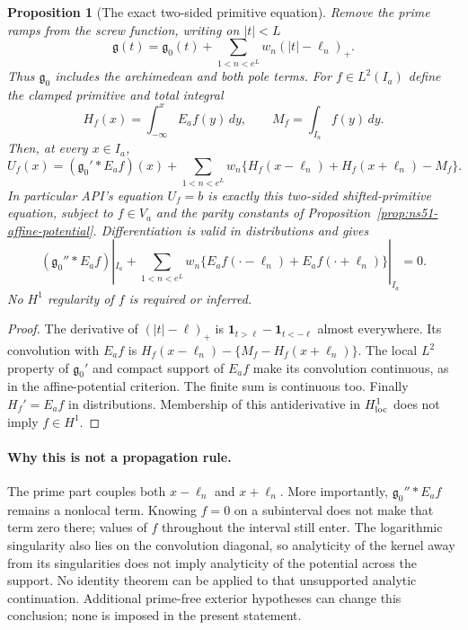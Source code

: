 \documentclass[11pt]{article}
\newtheorem{proposition}[theorem]{Proposition}
\theoremstyle{remark}
\begin{document}
\begin{proposition}[The exact two-sided primitive equation]
\label{prop:ns55-prime-primitives}
Remove the prime ramps from the screw function, writing on $|t|<L$
\[
 \mathfrak g(t)=\mathfrak g_0(t)+
       \sum_{1<n<e^L}w_n(|t|-\ell_n)_+.
\]
Thus $\mathfrak g_0$ includes the archimedean and both pole terms.
For $f\in L^2(I_a)$ define the clamped primitive and total integral
\[
 H_f(x)=\int_{-\infty}^x E_af(y)\,dy,
 \qquad M_f=\int_{I_a}f(y)\,dy.
\]
Then, at every $x\in I_a$,
\begin{equation}\label{eq:ns55-prime-primitive}
 U_f(x)=(\mathfrak g_0'*E_af)(x)+
 \sum_{1<n<e^L}w_n
       \{H_f(x-\ell_n)+H_f(x+\ell_n)-M_f\}.
\end{equation}
In particular API's equation $U_f=b$ is exactly this two-sided
shifted-primitive equation, subject to $f\in V_a$ and the parity constants
of Proposition~\ref{prop:ns51-affine-potential}. Differentiation is valid
in distributions and gives
\begin{equation}\label{eq:ns55-prime-differentiated}
 (\mathfrak g_0''*E_af)|_{I_a}
 +\sum_{1<n<e^L}w_n\{E_af(\cdot-\ell_n)+E_af(\cdot+\ell_n)\}|_{I_a}=0.
\end{equation}
No $H^1$ regularity of $f$ is required or inferred.
\end{proposition}
\begin{proof}
The derivative of $(|t|-\ell)_+$ is
$\mathbf1_{t>\ell}-\mathbf1_{t<-\ell}$ almost everywhere. Its
convolution with $E_af$ is
$H_f(x-\ell_n)-\{M_f-H_f(x+\ell_n)\}$.
The local $L^2$ property of $\mathfrak g_0'$ and compact support of
$E_af$ make its convolution continuous, as in the affine-potential
criterion. The finite sum is continuous too. Finally
$H_f'=E_af$ in distributions. Membership of this antiderivative in
$H^1_{\rm loc}$ does not imply $f\in H^1$.
\end{proof}

\paragraph{Why this is not a propagation rule.}
The prime part couples both $x-\ell_n$ and $x+\ell_n$.
More importantly, $\mathfrak g_0''*E_af$ remains a nonlocal term.
Knowing $f=0$ on a subinterval does not make that term zero there;
values of $f$ throughout the interval still enter. The logarithmic
singularity also lies on the convolution diagonal, so analyticity
of the kernel away from its singularities does not imply analyticity
of the potential across the support. No identity theorem can be
applied to that unsupported analytic continuation. Additional
prime-free exterior hypotheses can change this conclusion; none
is imposed in the present statement.
\end{document}
